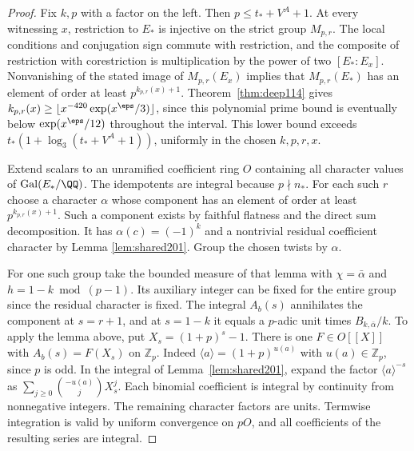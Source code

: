 \documentclass[a4paper,11pt]{article}
\theoremstyle{definition}
\theoremstyle{remark}
\newcommand{\ZZ}{\mathbb Z}\newcommand{\ord}{\operatorname{ord}}
\numberwithin{equation}{section}
\begin{document}
\begin{proof}
Fix \(k,p\) with a factor on the left. Then
\(p\le t_*+V^A+1\). At every witnessing \(x\), restriction to
\(E_*\) is injective on the strict group \(M_{p,r}\). The local
conditions and conjugation sign commute with restriction, and
the composite of restriction with corestriction is
multiplication by the power of two \([E_*:E_x]\).
Nonvanishing of the stated image of \(M_{p,r}(E_x)\) implies
that \(M_{p,r}(E_*)\) has an element of order at least
\(p^{k_{p,r}(x)+1}\). Theorem~\ref{thm:deep114} gives
\(k_{p,r}(x)\ge\lfloor x^{-420}\allowbreak\exp(x^\eps/3)\rfloor\),
since this polynomial prime bound is eventually below
\(\exp(x^\eps/12)\) throughout the interval. This lower
bound exceeds \(t_*(1+\log_3(t_*+V^A+1))\), uniformly in
the chosen \(k,p,r,x\).

Extend scalars to an unramified coefficient ring \(O\) containing
all character values of \(\operatorname{Gal}(E_*/\QQ)\).
The idempotents are integral because \(p\nmid n_*\). For each
such \(r\) choose a character \(\alpha\) whose component has
an element of order at least \(p^{k_{p,r}(x)+1}\). Such a
component exists by faithful flatness and the direct sum
decomposition. It has \(\alpha(c)=(-1)^k\) and a nontrivial
residual coefficient character by
Lemma \ref{lem:shared201}.
Group the chosen twists by \(\alpha\).

For one such group take the bounded measure of that lemma with
\(\chi=\bar\alpha\) and \(h=1-k\bmod(p-1)\). Its auxiliary
integer can be fixed for the entire group since the residual
character is fixed. The integral \(A_b(s)\) annihilates the
component at \(s=r+1\), and at \(s=1-k\) it equals a
\(p\)-adic unit times \(B_{k,\bar\alpha}/k\). To apply the
lemma above, put \(X_s=(1+p)^s-1\). There is one
\(F\in O[[X]]\) with \(A_b(s)=F(X_s)\) on \(\ZZ_p\).
Indeed \(\langle a\rangle=(1+p)^{u(a)}\) with
\(u(a)\in\ZZ_p\), since \(p\) is odd. In the integral of
Lemma~\ref{lem:shared201}, expand the factor
\(\langle a\rangle^{-s}\) as
\(\sum_{j\ge0}\binom{-u(a)}j X_s^j\).
Each binomial coefficient is integral by continuity from
nonnegative integers. The remaining character factors are
units. Termwise integration is valid by uniform convergence
on \(pO\), and all coefficients of the resulting series are
integral.


\end{proof}
\end{document}
